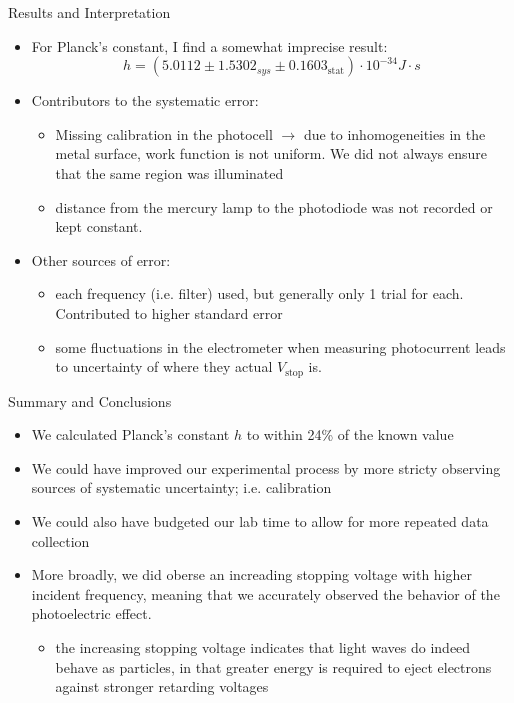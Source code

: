 \documentclass[hyperref=pdftex, presentation]{beamer}
\begin{document}
\begin{frame}{\Large Results and Interpretation}
\begin{itemize}
 \item For Planck's constant, I find a somewhat imprecise result: $$h = (5.0112\pm1.5302_{sys}\pm0.1603_{\mathrm{stat}})\cdot 10^{-34} J\cdot s$$
 \item Contributors to the systematic error: 
 \begin{itemize}
 	\item Missing calibration in the photocell $\rightarrow$ due to inhomogeneities in the metal surface, work function is not uniform. We did not always ensure that the same region was illuminated
 	\item distance from the mercury lamp to the photodiode was not recorded or kept constant.
 \end{itemize}
 \item Other sources of error:
 \begin{itemize}
	\item each frequency (i.e. filter) used, but generally only 1 trial for each. Contributed to higher standard error
	\item some fluctuations in the electrometer when measuring photocurrent leads to uncertainty of where they actual $V_{\mathrm{stop}}$ is.
	
  \end{itemize}
\end{itemize}
\end{frame}


\begin{frame}{Summary and Conclusions}

\begin{itemize}
 \item We calculated Planck's constant $h$ to within 24\% of the known value
 \item We could have improved our experimental process by more stricty observing sources of systematic uncertainty; i.e. calibration
 \item We could also have budgeted our lab time to allow for more repeated data collection
 \item More broadly, we did oberse an increading stopping voltage with higher incident frequency, meaning that we accurately observed the behavior of the photoelectric effect. 
 \begin{itemize}
 	\item the increasing stopping voltage indicates that light waves do indeed behave as particles, in that greater energy is required to eject electrons against stronger retarding voltages
 \end{itemize}

\end{itemize}


\end{frame}
\end{document}
